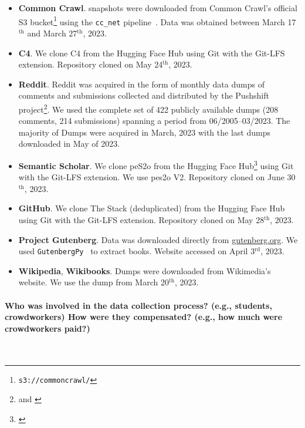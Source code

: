 \begin{itemize}[leftmargin=1em]
    \item \textbf{Common Crawl}. snapshots were downloaded from Common Crawl's official S3 bucket\footnote{\texttt{s3://commoncrawl/}} using the \texttt{cc\_net} pipeline~\citep{wenzek-etal-2020-ccnet}. Data was obtained between March 17$^\textrm{th}$ and March 27$^\textrm{th}$, 2023.
    \item \textbf{C4}. We clone C4 from the Hugging Face Hub using Git with the Git-LFS extension. Repository cloned on May 24$^\textrm{th}$, 2023.
    \item \textbf{Reddit}. Reddit was acquired in the form of monthly data dumps of  comments and submissions collected and distributed by the Pushshift project\footnote{\href{https://files.pushshift.io/reddit/submissions/}{} and \href{https://files.pushshift.io/reddit/comments/}{}}. We used the complete set of 422 publicly available dumps (208 comments, 214 submissions) spanning a period from 06/2005--03/2023. The majority of Dumps were acquired in March, 2023 with the last dumps downloaded in May of 2023.
    \item \textbf{Semantic Scholar}. We clone peS2o from the Hugging Face Hub\footnote{\href{https://huggingface.co/datasets/allenai/peS2o}{}} using Git with the Git-LFS extension. We use pes2o V2. Repository cloned on June 30$^\textrm{th}$, 2023.
    \item \textbf{GitHub}. We clone The Stack (deduplicated) from the Hugging Face Hub using Git with the Git-LFS extension. Repository cloned on May 28$^\textrm{th}$, 2023.
    \item \textbf{Project Gutenberg}. Data was downloaded directly from \url{gutenberg.org}. We used \texttt{GutenbergPy}~\citep{GutenbergPy} to extract books. Website accessed on April 3$^\textrm{rd}$, 2023.
    \item \textbf{Wikipedia}, \textbf{Wikibooks}. Dumps were downloaded from Wikimedia's website. We use the dump from March 20$^\textrm{th}$, 2023.
\end{itemize}

\paragraph{Who was involved in the data collection process? (e.g., students, crowdworkers) How were they compensated? (e.g., how much were crowdworkers paid?)}~


